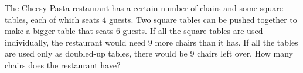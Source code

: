 The Cheesy Pasta restaurant has a certain number of chairs and some square tables, each of which seats $4$ guests. Two square tables can be pushed together to make a bigger table that seats $6$ guests. If all the square tables are used individually, the restaurant would need $9$ more chairs than it has. If all the tables are used only as doubled-up tables, there would be $9$ chairs left over. How many chairs does the restaurant have?
